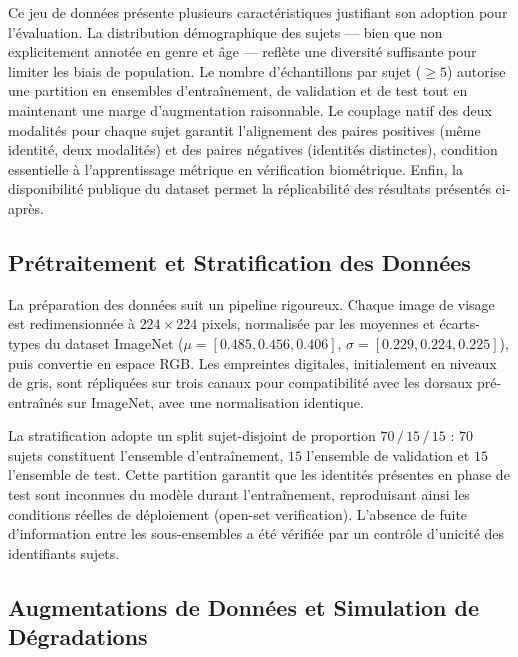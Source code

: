 \documentclass[12pt,a4paper]{report}
\begin{document}
Ce jeu de donn\'{e}es pr\'{e}sente plusieurs caract\'{e}ristiques justifiant son adoption pour l'\'{e}valuation. La distribution d\'{e}mographique des sujets --- bien que non explicitement annot\'{e}e en genre et \^{a}ge --- refl\`{e}te une diversit\'{e} suffisante pour limiter les biais de population. Le nombre d'\'{e}chantillons par sujet ($\geq 5$) autorise une partition en ensembles d'entra\^{i}nement, de validation et de test tout en maintenant une marge d'augmentation raisonnable. Le couplage natif des deux modalit\'{e}s pour chaque sujet garantit l'alignement des paires positives (m\^{e}me identit\'{e}, deux modalit\'{e}s) et des paires n\'{e}gatives (identit\'{e}s distinctes), condition essentielle \`{a} l'apprentissage m\'{e}trique en v\'{e}rification biom\'{e}trique. Enfin, la disponibilit\'{e} publique du dataset permet la r\'{e}plicabilit\'{e} des r\'{e}sultats pr\'{e}sent\'{e}s ci-apr\`{e}s.

\subsection{Pr\'{e}traitement et Stratification des Donn\'{e}es}

La pr\'{e}paration des donn\'{e}es suit un pipeline rigoureux. Chaque image de visage est redimensionn\'{e}e \`{a} $224 \times 224$ pixels, normalis\'{e}e par les moyennes et \'{e}carts-types du dataset ImageNet ($\mu = [0.485, 0.456, 0.406]$, $\sigma = [0.229, 0.224, 0.225]$), puis convertie en espace RGB. Les empreintes digitales, initialement en niveaux de gris, sont r\'{e}pliqu\'{e}es sur trois canaux pour compatibilit\'{e} avec les dorsaux pr\'{e}-entra\^{i}n\'{e}s sur ImageNet, avec une normalisation identique.

La stratification adopte un split sujet-disjoint de proportion $70\,/\,15\,/\,15$ : $70$ sujets constituent l'ensemble d'entra\^{i}nement, $15$ l'ensemble de validation et $15$ l'ensemble de test. Cette partition garantit que les identit\'{e}s pr\'{e}sentes en phase de test sont inconnues du mod\`{e}le durant l'entra\^{i}nement, reproduisant ainsi les conditions r\'{e}elles de d\'{e}ploiement (open-set verification). L'absence de fuite d'information entre les sous-ensembles a \'{e}t\'{e} v\'{e}rifi\'{e}e par un contr\^{o}le d'unicit\'{e} des identifiants sujets.

\subsection{Augmentations de Donn\'{e}es et Simulation de D\'{e}gradations}
\end{document}
